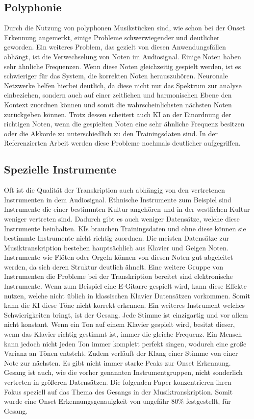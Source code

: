 \subsection{Polyphonie}
Durch die Nutzung von polyphonen Musikstücken sind, wie schon bei der Onset Erkennung angemerkt,
einige Probleme schwerwiegender und deutlicher geworden.
Ein weiteres Problem, das gezielt von diesen Anwendungsfällen abhängt, ist die Verwechselung von Noten im Audiosignal.
Einige Noten haben sehr ähnliche Frequenzen.
Wenn diese Noten gleichzeitig gespielt werden, ist es schwieriger für das System, die korrekten Noten herauszuhören.
Neuronale Netzwerke helfen hierbei deutlich, da diese nicht nur das Spektrum zur analyse einbeziehen,
sondern auch auf einer zeitlichen und harmonischen Ebene den Kontext zuordnen können
und somit die wahrscheinlichsten nächsten Noten zurückgeben können.
Trotz dessen scheitert auch KI an der Einordnung der richtigen Noten, wenn die gespielten Noten
eine sehr ähnliche Frequenz besitzen oder die Akkorde zu unterschiedlich zu den Trainingsdaten sind.
In der Referenzierten Arbeit \cite{martak2022balancing} werden diese Probleme nochmals deutlicher aufgegriffen.

\subsection{Spezielle Instrumente}
Oft ist die Qualität der Transkription auch abhängig von den vertretenen Instrumenten in dem Audiosignal.
Ethnische Instrumente zum Beispiel sind Instrumente die einer bestimmten Kultur angehören
und in der westlichen Kultur weniger vertreten sind.
Dadurch gibt es auch weniger Datensätze, welche diese Instrumente beinhalten.
KIs brauchen Trainingsdaten und ohne diese können sie bestimmte Instrumente nicht richtig zuordnen.
Die meisten Datensätze zur Musiktranskription bestehen hauptsächlich aus Klavier und Geigen Noten.
Instrumente wie Flöten oder Orgeln können von diesen Noten gut abgeleitet werden,
da sich deren Struktur deutlich ähnelt.
Eine weitere Gruppe von Instrumenten die Probleme bei der Transkription bereitet sind elektronische Instrumente.
Wenn zum Beispiel eine E-Gitarre gespielt wird, kann diese Effekte nutzen,
welche nicht üblich in klassischen Klavier Datensätzen vorkommen.
Somit kann die KI diese Töne nicht korrekt erkennen.
Ein weiteres Instrument welches Schwierigkeiten bringt, ist der Gesang.
Jede Stimme ist einzigartig und vor allem nicht konstant.
Wenn ein Ton auf einem Klavier gespielt wird, besitzt dieser,
wenn das Klavier richtig gestimmt ist, immer die gleiche Frequenz.
Ein Mensch kann jedoch nicht jeden Ton immer komplett perfekt singen, wodurch eine große Varianz an Tönen entsteht.
Zudem verläuft der Klang einer Stimme von einer Note zur nächsten.
Es gibt nicht immer starke Peaks zur Onset Erkennung.
Gesang ist auch, wie die vorher genannten Instrumentgruppen, nicht sonderlich vertreten in größeren Datensätzen.
Die folgenden Paper konzentrieren ihren Fokus speziell auf das Thema des Gesangs in der Musiktranskription.
\cite{gu2023deep,gu2024automatic}
Somit wurde eine Onset Erkennungsgenauigkeit von ungefähr 80\% festgestellt, für Gesang.

